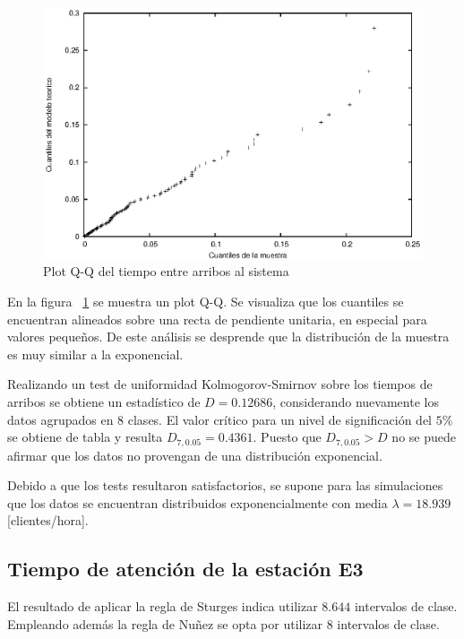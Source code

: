\documentclass[a4paper,10pt]{article}
\begin{document}
\begin{figure}[hp]
\centering
\includegraphics{graficos/plot_qq_llegadas.eps}
\caption{Plot Q-Q del tiempo entre arribos al sistema}
\label{fig:qqarribos}
\end{figure}


En la figura ~\ref{fig:qqarribos} se muestra un plot Q-Q. Se visualiza que los cuantiles se encuentran
alineados sobre una recta de pendiente unitaria, en especial para valores
peque\~nos. De este an\'alisis se desprende que la distribuci\'on de la
muestra es muy similar a la exponencial.


Realizando un test de uniformidad
Kolmogorov-Smirnov sobre los tiempos de arribos se obtiene un estad\'istico
de $D = 0.12686$, considerando nuevamente los datos agrupados en $8$ clases. 
El valor cr\'itico para un nivel de significaci\'on del $5\%$ 
se obtiene de tabla y resulta $D_{7, 0.05} = 0.4361$.
Puesto que $D_{7,0.05} > D$ no se puede afirmar que los datos
no provengan de una distribuci\'on exponencial. 


Debido a que los tests resultaron satisfactorios, se supone para las 
simulaciones que los datos se encuentran distribuidos exponencialmente con media
$\lambda = 18.939$ [clientes/hora].


\subsection*{Tiempo de atenci\'on de la estaci\'on E3}


El resultado de aplicar la regla de Sturges indica utilizar $8.644$ intervalos
de clase. Empleando adem\'as la regla de Nu\~nez se opta por utilizar $8$ 
intervalos de clase.
\end{document}
